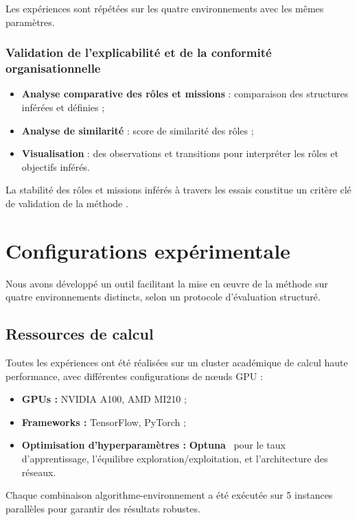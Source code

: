 Les expériences sont répétées sur les quatre environnements avec les mêmes paramètres.

\subsubsection{Validation de l'explicabilité et de la conformité organisationnelle}

\begin{itemize}
    \item \textbf{Analyse comparative des rôles et missions} : comparaison des structures inférées et définies ;
    \item \textbf{Analyse de similarité} : score de similarité des rôles ;
    \item \textbf{Visualisation} :  des observations et transitions pour interpréter les rôles et objectifs inférés.
\end{itemize}

La stabilité des rôles et missions inférés à travers les essais constitue un critère clé de validation de la méthode .

\section{Configurations expérimentale}
\label{sec:experimental_setup}

Nous avons développé un outil facilitant la mise en œuvre de la méthode  sur quatre environnements distincts, selon un protocole d'évaluation structuré.

\subsection{Ressources de calcul}

Toutes les expériences ont été réalisées sur un cluster académique de calcul haute performance, avec différentes configurations de nœuds GPU :
\begin{itemize}
    \item \textbf{GPUs :} NVIDIA A100, AMD MI210 ;
    \item \textbf{Frameworks :} TensorFlow, PyTorch ;
    \item \textbf{Optimisation d'hyperparamètres :} \textbf{Optuna}~\cite{akiba2019optuna} pour le taux d'apprentissage, l'équilibre exploration/exploitation, et l'architecture des réseaux.
\end{itemize}

Chaque combinaison algorithme-environnement a été exécutée sur 5 instances parallèles pour garantir des résultats robustes.

